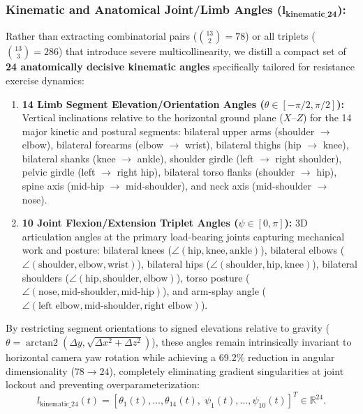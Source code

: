 \documentclass[preprint,12pt]{elsarticle}
\begin{document}
\subsubsection{Kinematic and Anatomical Joint/Limb Angles ($\mathbf{l_{\text{kinematic\_24}}}$):}
Rather than extracting combinatorial pairs ($\binom{13}{2} = 78$) or all triplets ($\binom{13}{3} = 286$) that introduce severe multicollinearity, we distill a compact set of \textbf{24 anatomically decisive kinematic angles} specifically tailored for resistance exercise dynamics:
\begin{enumerate}
    \item \textbf{14 Limb Segment Elevation/Orientation Angles ($\theta \in [-\pi/2, \pi/2]$):} Vertical inclinations relative to the horizontal ground plane ($X\text{--}Z$) for the 14 major kinetic and postural segments: bilateral upper arms (shoulder $\to$ elbow), bilateral forearms (elbow $\to$ wrist), bilateral thighs (hip $\to$ knee), bilateral shanks (knee $\to$ ankle), shoulder girdle (left $\to$ right shoulder), pelvic girdle (left $\to$ right hip), bilateral torso flanks (shoulder $\to$ hip), spine axis (mid-hip $\to$ mid-shoulder), and neck axis (mid-shoulder $\to$ nose).
    \item \textbf{10 Joint Flexion/Extension Triplet Angles ($\psi \in [0, \pi]$):} 3D articulation angles at the primary load-bearing joints capturing mechanical work and posture: bilateral knees ($\angle(\text{hip}, \text{knee}, \text{ankle})$), bilateral elbows ($\angle(\text{shoulder}, \text{elbow}, \text{wrist})$), bilateral hips ($\angle(\text{shoulder}, \text{hip}, \text{knee})$), bilateral shoulders ($\angle(\text{hip}, \text{shoulder}, \text{elbow})$), torso posture ($\angle(\text{nose}, \text{mid-shoulder}, \text{mid-hip})$), and arm-splay angle ($\angle(\text{left elbow}, \text{mid-shoulder}, \text{right elbow})$).
\end{enumerate}
By restricting segment orientations to signed elevations relative to gravity ($\theta = \operatorname{arctan2}(\Delta y, \sqrt{\Delta x^2 + \Delta z^2})$), these angles remain intrinsically invariant to horizontal camera yaw rotation while achieving a 69.2\% reduction in angular dimensionality ($78 \to 24$), completely eliminating gradient singularities at joint lockout and preventing overparameterization:
\begin{equation}
    l_{\text{kinematic\_24}}(t) = \left[ \theta_1(t), \dots, \theta_{14}(t), \; \psi_1(t), \dots, \psi_{10}(t) \right]^T \in \mathbb{R}^{24}.
\end{equation}
\end{document}
